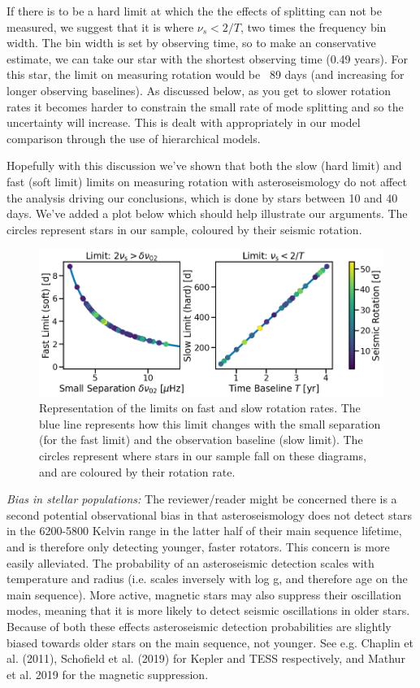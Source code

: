 \documentclass[11pt]{article}
\begin{document}
\begin{enumerate}
 If there is to be a hard limit at which the the effects of splitting can not be measured, we suggest that it is where $\nu_s < 2/T$, two times the frequency bin width. The bin width is set by observing time, so to make an conservative estimate, we can take our star with the shortest observing time  (0.49 years). For this star, the limit on measuring rotation would be ~89 days (and increasing for longer observing baselines). As discussed below, as you get to slower rotation rates it becomes harder to constrain the small rate of mode splitting and so the uncertainty will increase. This is dealt with appropriately in our model comparison through the use of hierarchical models.
\end{enumerate}

Hopefully with this discussion we’ve shown that both the slow (hard limit) and fast (soft limit) limits on measuring rotation with asteroseismology do not affect the analysis driving our conclusions, which is done by stars between 10 and 40 days. We’ve added a plot below which should help illustrate our arguments. The circles represent stars in our sample, coloured by their seismic rotation.\\

\begin{figure}[h!]
\includegraphics[width=\textwidth]{image1.png}
\caption{Representation of the limits on fast and slow rotation rates. The blue line represents how this limit changes with the small separation (for the fast limit) and the observation baseline (slow limit). The circles represent where stars in our sample fall on these diagrams, and are coloured by their rotation rate.}
\end{figure}

\textit{Bias in stellar populations:} The reviewer/reader might be concerned there is a second potential observational bias in that asteroseismology does not detect stars in the 6200-5800 Kelvin range in the latter half of their main sequence lifetime, and is therefore only detecting younger, faster rotators. This concern is more easily alleviated. The probability of an asteroseismic detection scales with temperature and radius (i.e. scales inversely with log g, and therefore age on the main sequence). More active, magnetic stars may also suppress their oscillation modes, meaning that it is more likely to detect seismic oscillations in older stars.  Because of both these effects asteroseismic detection probabilities are slightly biased towards older stars on the main sequence, not younger. See e.g. Chaplin et al. (2011), Schofield et al. (2019) for Kepler and TESS respectively, and Mathur et al. 2019 for the magnetic suppression.
\end{document}

